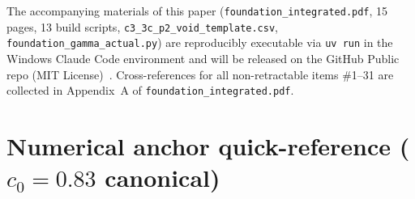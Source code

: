 \documentclass[11pt,a4paper]{article}
\begin{document}
\begin{sloppypar}
The accompanying materials of this paper (\texttt{foundation\_integrated.pdf}, 15 pages, 13 build
scripts, \texttt{c3\_3c\_p2\_void\_template.csv}, \texttt{foundation\_gamma\_actual.py}) are
reproducibly executable via \texttt{uv run} in the Windows Claude Code environment and will be
released on the GitHub Public repo (MIT License)~\citep{Sakaguchi2026b}. Cross-references for all
non-retractable items \#1--31 are collected in Appendix~A of
\texttt{foundation\_integrated.pdf}.
\end{sloppypar}




\clearpage
\appendix
\section{Numerical anchor quick-reference ($c_0 = 0.83$ canonical)}
\end{document}
